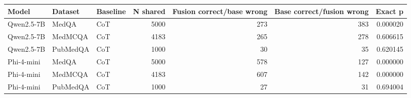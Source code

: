 \begin{tabular}{lllrrrr}
\toprule
Model & Dataset & Baseline & N shared & Fusion correct/base wrong & Base correct/fusion wrong & Exact p \\
\midrule
Qwen2.5-7B & MedQA & CoT & 5000 & 273 & 383 & 0.000020 \\
Qwen2.5-7B & MedMCQA & CoT & 4183 & 265 & 278 & 0.606615 \\
Qwen2.5-7B & PubMedQA & CoT & 1000 & 30 & 35 & 0.620145 \\
Phi-4-mini & MedQA & CoT & 5000 & 578 & 127 & 0.000000 \\
Phi-4-mini & MedMCQA & CoT & 4183 & 607 & 142 & 0.000000 \\
Phi-4-mini & PubMedQA & CoT & 1000 & 27 & 31 & 0.694004 \\
\bottomrule
\end{tabular}
